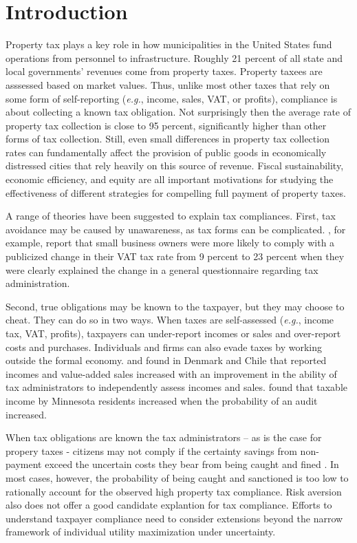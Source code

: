 \documentclass[12pt,titlepage]{article}
\begin{document}
\newpage

\section{Introduction}

Property tax plays a key role in how municipalities in the
United States fund operations from personnel to infrastructure.
Roughly 21 percent of all state and local governments’ revenues
come from property taxes.  Property taxees are asssessed based
on market values. Thus, unlike most other taxes that rely on some 
form of self-reporting  (\textit{e.g.}, income, sales,
VAT, or profits), compliance is about collecting a known tax obligation.  
Not surprisingly then the average rate of property tax collection is close
to 95 percent, significantly higher than other forms of tax collection.  
Still, even small differences in property tax collection rates can fundamentally
affect the provision of public goods in economically distressed cities that 
rely heavily on this source of revenue.  Fiscal sustainability, economic efficiency,
and equity are all important motivations for studying the effectiveness of different
strategies for compelling full payment of property taxes.  

A range of theories have been suggested to explain tax compliances. 
First, tax avoidance may be caused by unawareness, as tax forms can be complicated. 
\citet{kosonen}, for example, report that small business owners were more likely to comply
with a publicized change in their VAT tax rate from 9 percent to 23 percent when they 
were clearly explained the change in a general questionnaire
regarding tax administration. 

Second, true obligations may be known to the taxpayer, but they may
choose to cheat.  They can do so in two ways.  When taxes are
self-assessed (\textit{e.g.}, income tax, VAT, profits), taxpayers can
under-report incomes or sales and over-report costs and purchases. 
Individuals and firms can also evade taxes by working outside the formal economy. 
\citet{kleven}  and \citet{pomeranz}
found in Denmark and Chile that reported incomes and value-added
sales increased with an improvement in the ability of tax administrators to
independently assess incomes and sales. \citep{blumenthal} found that taxable 
income by Minnesota residents increased when the probability of an audit increased.  

When tax obligations are known the tax administrators -- as is the case for propery taxes - 
citizens may not comply if the certainty savings from non-payment exceed the uncertain costs they bear from
being caught and fined \citet{allingham}.  In most cases, however, the probability of 
being caught and sanctioned is too low to rationally account for the observed high 
property tax compliance.    Risk aversion also does not offer a good candidate explantion 
for tax compliance\citep{alm}. Efforts to understand taxpayer 
compliance need to consider extensions beyond the narrow framework of 
individual utility maximization under uncertainty.  
\end{document}
